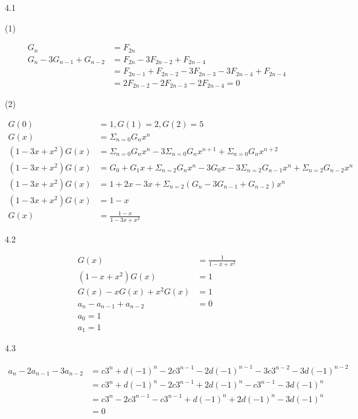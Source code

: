 \documentclass[a4paper]{article}
\begin{document}
\courseheader

\begin{enumerate}

4.1

\begin{solution}

(1)

\begin{align}
    G_n &= F_{2n}\\
    G_n-3G_{n-1}+G_{n-2} &= F_{2n}-3F_{2n-2}+F_{2n-4}\\
    &= F_{2n-1}+F_{2n-2}-3F_{2n-3}-3F_{2n-4}+F_{2n-4}\\
    &= 2F_{2n-2}-2F_{2n-3}-2F_{2n-4}=0
\end{align}

(2)

\begin{align}
    G(0) &= 1, G(1)= 2, G(2)=5\\
    G(x) &= \Sigma_{n=0}G_n x^n\\
    (1-3x+x^2)G(x) &= \Sigma_{n=0}G_nx^n - 3\Sigma_{n=0}G_nx^{n+1}+\Sigma_{n=0}G_n x^{n+2}\\
    (1-3x+x^2)G(x) &= G_0+G_1x+\Sigma_{n=2}G_nx^n-3G_0x-3\Sigma_{n=2}G_{n-1}x^n+\Sigma_{n=2}G_{n-2}x^n\\
    (1-3x+x^2)G(x)&=1+2x-3x+\Sigma_{n=2}(G_n-3G_{n-1}+G_{n-2})x^n\\
    (1-3x+x^2)G(x)&=1-x\\
    G(x)&=\frac{1-x}{1-3x+x^2}
\end{align}

\end{solution}

4.2

\begin{solution}

\begin{align}
    G(x) &= \frac{1}{1-x+x^2}\\
    (1-x+x^2)G(x) &= 1\\
    G(x)-xG(x)+x^2G(x) &= 1\\
    a_n-a_{n-1}+a_{n-2} &= 0\\
    a_0=1\\
    a_1=1
\end{align}

\end{solution}

4.3

\begin{solution}

\begin{align}
    a_n-2a_{n-1}-3a_{n-2} &= c3^n+d(-1)^n-2c3^{n-1}-2d(-1)^{n-1}-3c3^{n-2}-3d(-1)^{n-2}\\
    &= c3^n+d(-1)^n-2c3^{n-1}+2d(-1)^{n}-c3^{n-1}-3d(-1)^{n}\\
    &=c3^n-2c3^{n-1}-c3^{n-1}+d(-1)^n+2d(-1)^{n}-3d(-1)^{n}\\
    &=0
\end{align}


\end{solution}
\end{enumerate}
\end{document}
